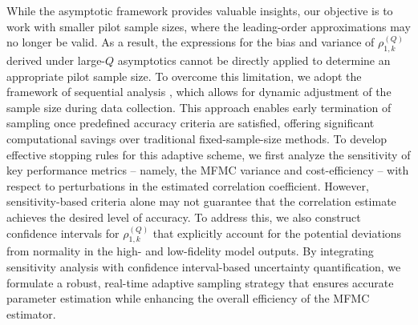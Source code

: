 While the asymptotic framework provides valuable insights, our objective is to work with smaller pilot sample sizes, where the leading-order approximations may no longer be valid. As a result, the expressions for the bias and variance of $\rho_{1,k}^{(Q)}$ derived under large-$Q$ asymptotics cannot be directly applied to determine an appropriate pilot sample size. To overcome this limitation, we adopt the framework of sequential analysis \cite{Wa:1947}, which allows for dynamic adjustment of the sample size during data collection. This approach enables early termination of sampling once predefined accuracy criteria are satisfied, offering significant computational savings over traditional fixed-sample-size methods. To develop effective stopping rules for this adaptive scheme, we first analyze the sensitivity of key performance metrics -- namely, the MFMC variance and cost-efficiency -- with respect to perturbations in the estimated correlation coefficient. However, sensitivity-based criteria alone may not guarantee that the correlation estimate achieves the desired level of accuracy. To address this, we also construct confidence intervals for $\rho_{1,k}^{(Q)}$ that explicitly account for the potential deviations from normality in the high- and low-fidelity model outputs. By integrating sensitivity analysis with confidence interval-based uncertainty quantification, we formulate a robust, real-time adaptive sampling strategy that ensures accurate parameter estimation while enhancing the overall efficiency of the MFMC estimator.




